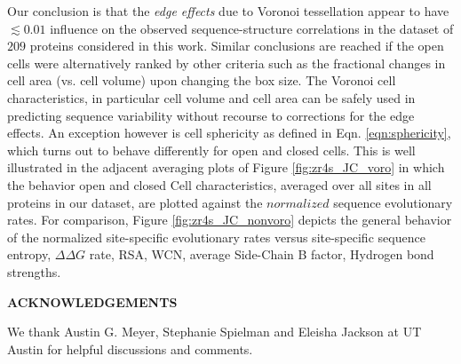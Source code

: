 \documentclass[11pt]{article}
\def\Acknowledgements{\bigskip  \bigskip \begin{center} \begin{large}
             \bf ACKNOWLEDGEMENTS \end{large}\end{center}}
\begin{document}
    Our conclusion is that the {\it edge effects} due to Voronoi tessellation appear to have $\lesssim0.01$ influence on the observed sequence-structure correlations in the dataset of $209$ proteins considered in this work. Similar conclusions are reached if the open cells were alternatively ranked by other criteria such as the fractional changes in cell area (vs. cell volume) upon changing the box size. The Voronoi cell characteristics, in particular cell volume and cell area can be safely used in predicting sequence variability without recourse to corrections for the edge effects. An exception however is cell sphericity as defined in Eqn. \ref{eqn:sphericity}, which turns out to behave differently for open and closed cells. This is well illustrated in the adjacent averaging plots of Figure \ref{fig:zr4s_JC_voro} in which the behavior open and closed Cell characteristics, averaged over all sites in all proteins in our dataset, are plotted against the $normalized$ sequence evolutionary rates. For comparison, Figure \ref{fig:zr4s_JC_nonvoro} depicts the general behavior of the normalized site-specific evolutionary rates versus site-specific sequence entropy, $\Delta\Delta G$ rate, RSA, WCN, average Side-Chain B factor, Hydrogen bond strengths.



\Acknowledgements

We thank Austin G. Meyer, Stephanie Spielman and Eleisha Jackson at UT Austin for helpful discussions and comments.




\newpage
\end{document}
